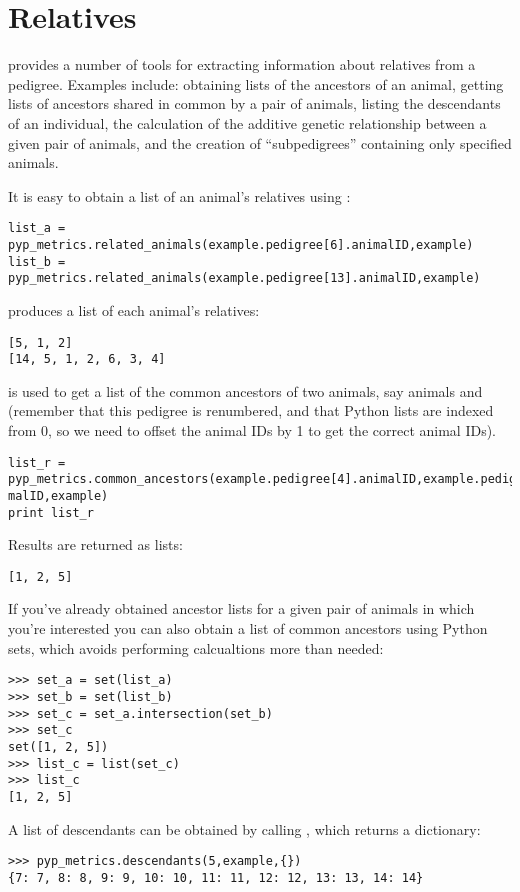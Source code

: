 \section{Relatives}\label{sec:computing-relatives}
\PyPedal{} provides a number of tools for extracting information about relatives from a pedigree. Examples include: obtaining lists of the ancestors of an animal, getting lists of ancestors shared in common by a pair of animals, listing the descendants of an individual, the calculation of the additive genetic relationship between a given pair of animals, and the creation of ``subpedigrees'' containing only specified animals.

It is easy to obtain a list of an animal's relatives using :
\begin{verbatim}
list_a = pyp_metrics.related_animals(example.pedigree[6].animalID,example)
list_b = pyp_metrics.related_animals(example.pedigree[13].animalID,example)
\end{verbatim}
produces a list of each animal's relatives:
\begin{verbatim}
[5, 1, 2]
[14, 5, 1, 2, 6, 3, 4]
\end{verbatim}
 is used to get a list of the common ancestors of two animals, say animals  and  (remember that this pedigree is renumbered, and that Python lists are indexed from 0, so we need to offset the animal IDs by 1 to get the correct animal IDs).
\begin{verbatim}
list_r = pyp_metrics.common_ancestors(example.pedigree[4].animalID,example.pedigree[13].ani
malID,example)
print list_r
\end{verbatim}
Results are returned as lists:
\begin{verbatim}
[1, 2, 5]
\end{verbatim}
If you've already obtained ancestor lists for a given pair of animals in which you're interested you can also obtain a list of common ancestors using Python sets, which avoids performing calcualtions more than needed:
\begin{verbatim}
>>> set_a = set(list_a)
>>> set_b = set(list_b)
>>> set_c = set_a.intersection(set_b)
>>> set_c
set([1, 2, 5])
>>> list_c = list(set_c)
>>> list_c
[1, 2, 5]
\end{verbatim}
A list of descendants can be obtained by calling , which returns a dictionary:
\begin{verbatim}
>>> pyp_metrics.descendants(5,example,{})
{7: 7, 8: 8, 9: 9, 10: 10, 11: 11, 12: 12, 13: 13, 14: 14}
\end{verbatim}
